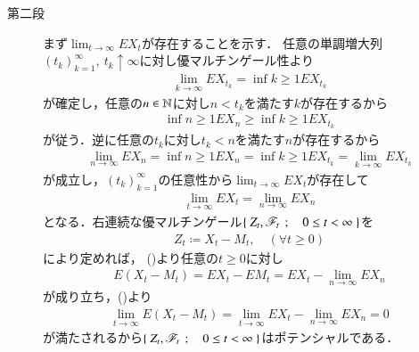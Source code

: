 \begin{prf}
\begin{description}
 			\item[第二段]
 				まず$\lim_{t \to \infty} EX_t$が存在することを示す．
 				任意の単調増大列$(t_k)_{k=1}^\infty,\ t_k \uparrow \infty$に対し優マルチンゲール性より
	 			\begin{align}
	 				\lim_{k \to \infty} EX_{t_k} = \inf{k \geq 1}{EX_{t_k}}
	 			\end{align}
	 			が確定し，任意の$n \in \mathbb{N}$に対し$n < t_k$を満たす$k$が存在するから
	 			\begin{align}
	 				\inf{n \geq 1}{EX_n} \geq \inf{k \geq 1}{EX_{t_k}}
	 			\end{align}
	 			が従う．逆に任意の$t_k$に対し$t_k < n$を満たす$n$が存在するから
	 			\begin{align}
	 				\lim_{n \to \infty} EX_n = \inf{n \geq 1}{EX_n} 
	 				= \inf{k \geq 1}{EX_{t_k}} = \lim_{k \to \infty} EX_{t_k}
	 			\end{align}
	 			が成立し，$(t_k)_{k=1}^\infty$の任意性から$\lim_{t \to \infty} EX_t$が存在して
	 			\begin{align}
	 				\lim_{t \to \infty} EX_t = \lim_{n \to \infty} EX_n
	 				\label{eq:chapter_1_Exercise_3_18_2}
	 			\end{align}
	 			となる．右連続な優マルチンゲール$\left\{\ Z_t,\mathscr{F}_t\ \, ; \quad 0 \leq t < \infty\ \right\}$を
	 			\begin{align}
 					Z_t \coloneqq X_t - M_t,
 					\quad (\forall t \geq 0)
 				\end{align}
 				により定めれば，
 				()より任意の$t \geq 0$に対し
 				\begin{align}
 					E(X_t - M_t)
 					= E X_t - E M_t
 					= EX_t - \lim_{n \to \infty} E X_n
 				\end{align}
 				が成り立ち，()より
 				\begin{align}
 					\lim_{t \to \infty} E(X_t - M_t)
 					= \lim_{t \to \infty} E X_t - \lim_{n \to \infty} E X_n
 					= 0
 				\end{align}
 				が満たされるから$\left\{\ Z_t,\mathscr{F}_t\ \, ; \quad 0 \leq t < \infty\ \right\}$はポテンシャルである．
 				\QED
 		\end{description}
 	\end{prf}
	
